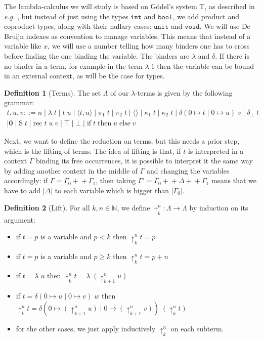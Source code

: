 \documentclass{article}
\renewcommand{\int}[0]{\texttt{int}}
\newcommand{\bool}[0]{\texttt{bool}}
\newcommand{\unit}[0]{\texttt{unit}}
\newcommand{\void}[0]{\texttt{void}}
\newcommand{\ife}[3]{\mathrm{if}\;#1\;\mathrm{then}\;#2\;\mathrm{else}\;#3}
\newcommand{\bO}[0]{\boldsymbol{0}}
\newcommand{\Ss}[0]{\mathrm{S}}
\newcommand{\rec}[0]{\mathrm{rec}}
\newcommand{\Tt}[0]{\top}
\newcommand{\Ff}[0]{\bot}
\newcommand{\bN}[0]{\mathbb N}
\newcommand{\lift}[2]{\uparrow_{#1}^{#2}}
\newcommand{\deltacase}[3]{\delta(0\mapsto #1\mid 0 \mapsto #2)\;#3}
\theoremstyle{definition}
\newtheorem{defi}{Definition}
\begin{document}
The lambda-calculus we will study is based on Gödel's system T, as described in \textit{e.g.}
\cite{Girard1989Proofs}, but instead of just using the types $\int$ and $\bool$, we add product and coproduct
types, along with their nullary cases: $\unit$ and $\void$. We will use De Bruijn indexes as convention to
manage variables. This means that instead of a variable like $x$, we will use a number telling how many binders
one has to cross before finding the one binding the variable. The binders are $\lambda$ and $\delta$. If there
is no binder in a term, for example in the term $\lambda\;1$ then the variable can be bound in an external
context, as will be the case for types.

\begin{defi}[Terms]
    The set $\Lambda$ of our $\lambda$-terms is given by the following grammar:
    \begin{multline*}
        t,u,v ::= n \mid \lambda\;t\mid t\;u \mid \langle t,u \rangle \mid \pi_1\;t \mid \pi_2\;t\mid 
        \langle\rangle \mid \kappa_1\;t\mid\kappa_2\;t \mid\delta(0 \mapsto t\mid 0 \mapsto u)\;v\mid
        \delta_\bot\;t\\ \mid\bO\mid \Ss\;t\mid \rec\;t\;u\;v\mid \Tt\mid\Ff\mid\ife{t}{u}{v}
    \end{multline*}
\end{defi}

Next, we want to define the reduction on terms, but this needs a prior step, which is the lifting of terms.
The idea of lifting is that, if $t$ is interpreted in a context $\Gamma$ binding its free occurrences, it is
possible to interpret it the same way by adding another context in the middle of $\Gamma$ and changing the
variables accordingly: if $\Gamma = \Gamma_0 +\!+\Gamma_1$, then taking
$\Gamma' = \Gamma_0 +\!\!+ \Delta +\!\!+ \Gamma_1$ means that we have to add $|\Delta|$ to each variable which 
is bigger than $|\Gamma_0|$.

\begin{defi}[Lift]
    For all $k,n\in\bN$, we define $\lift k n : \Lambda \to \Lambda$ by induction on its argument:
    \begin{itemize}
        \item if $t = p$ is a variable and $p < k$ then $\lift k n t = p$
        \item if $t = p$ is a variable and $p \geq k$ then $\lift k n t = p + n$
        \item if $t = \lambda\;u$ then $\lift k n t = \lambda\;(\lift {k+1} n u)$
        \item if $t = \deltacase{u}{v}{w}$ then
        $\lift k n t = \deltacase{(\lift {k+1} n u)}{(\lift {k+1} n v)}{(\lift k n t)}$
        \item for the other cases, we just apply inductively $\lift k n$ on each subterm.
    \end{itemize}
\end{defi}
\end{document}
